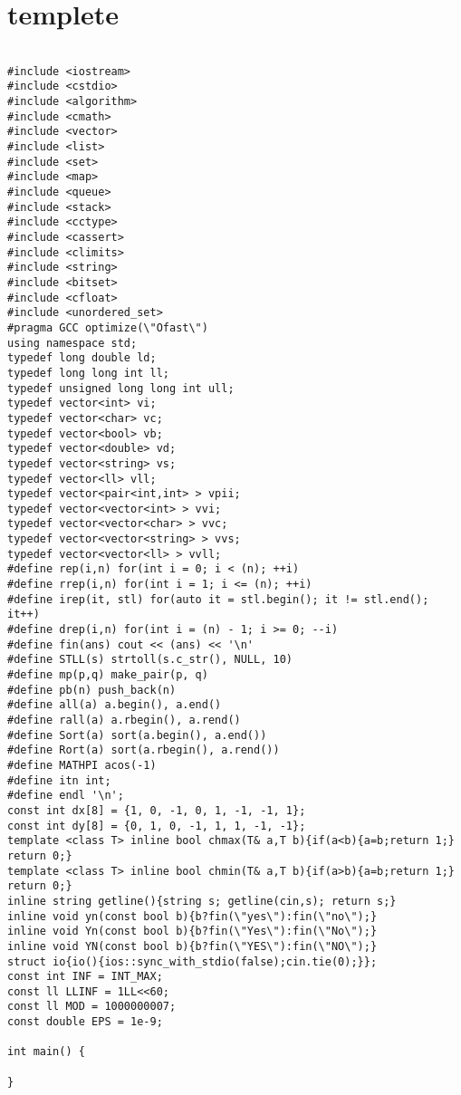 \documentclass[a4j,titlepage]{jarticle} %
\begin{document}
\section{templete}
\color{black}
\begin{lstlisting}[caption=templete]

#include <iostream>
#include <cstdio>
#include <algorithm>
#include <cmath>
#include <vector>
#include <list>
#include <set>
#include <map>
#include <queue>
#include <stack>
#include <cctype>
#include <cassert>
#include <climits>
#include <string>
#include <bitset>
#include <cfloat>
#include <unordered_set>
#pragma GCC optimize(\"Ofast\")
using namespace std;
typedef long double ld;
typedef long long int ll;
typedef unsigned long long int ull;
typedef vector<int> vi;
typedef vector<char> vc;
typedef vector<bool> vb;
typedef vector<double> vd;
typedef vector<string> vs;
typedef vector<ll> vll;
typedef vector<pair<int,int> > vpii;
typedef vector<vector<int> > vvi;
typedef vector<vector<char> > vvc;
typedef vector<vector<string> > vvs;
typedef vector<vector<ll> > vvll;
#define rep(i,n) for(int i = 0; i < (n); ++i)
#define rrep(i,n) for(int i = 1; i <= (n); ++i)
#define irep(it, stl) for(auto it = stl.begin(); it != stl.end(); it++)
#define drep(i,n) for(int i = (n) - 1; i >= 0; --i)
#define fin(ans) cout << (ans) << '\n'
#define STLL(s) strtoll(s.c_str(), NULL, 10)
#define mp(p,q) make_pair(p, q)
#define pb(n) push_back(n)
#define all(a) a.begin(), a.end()
#define rall(a) a.rbegin(), a.rend()
#define Sort(a) sort(a.begin(), a.end())
#define Rort(a) sort(a.rbegin(), a.rend())
#define MATHPI acos(-1)
#define itn int;
#define endl '\n';
const int dx[8] = {1, 0, -1, 0, 1, -1, -1, 1};
const int dy[8] = {0, 1, 0, -1, 1, 1, -1, -1};
template <class T> inline bool chmax(T& a,T b){if(a<b){a=b;return 1;} return 0;}
template <class T> inline bool chmin(T& a,T b){if(a>b){a=b;return 1;} return 0;}
inline string getline(){string s; getline(cin,s); return s;}
inline void yn(const bool b){b?fin(\"yes\"):fin(\"no\");}
inline void Yn(const bool b){b?fin(\"Yes\"):fin(\"No\");}
inline void YN(const bool b){b?fin(\"YES\"):fin(\"NO\");}
struct io{io(){ios::sync_with_stdio(false);cin.tie(0);}};
const int INF = INT_MAX;
const ll LLINF = 1LL<<60;
const ll MOD = 1000000007;
const double EPS = 1e-9;

int main() {
  
}

\end{lstlisting}

\color{white}
\end{document}
